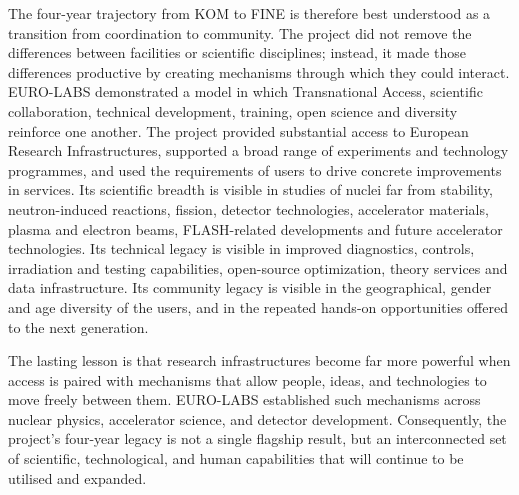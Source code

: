 The four-year trajectory from KOM to FINE is therefore best understood as a transition from coordination to community. The project did not remove the differences between facilities or scientific disciplines; instead, it made those differences productive by creating mechanisms through which they could interact.
EURO-LABS demonstrated a model in which Transnational Access, scientific collaboration, technical development, training, open science and diversity reinforce one another. The project provided substantial access to European Research Infrastructures, supported a broad range of experiments and technology programmes, and used the requirements of users to drive concrete improvements in services.
Its scientific breadth is visible in studies of nuclei far from stability, neutron-induced reactions, fission, detector technologies, accelerator materials, plasma and electron beams, FLASH-related developments and future accelerator technologies. Its technical legacy is visible in improved diagnostics, controls, irradiation and testing capabilities, open-source optimization, theory services and data infrastructure. Its community legacy is visible in the geographical, gender and age diversity of the users, and in the repeated hands-on opportunities offered to the next generation.


The lasting lesson is that research infrastructures become far more powerful when access is paired with mechanisms that allow people, ideas, and technologies to move freely between them. EURO-LABS established such mechanisms across nuclear physics, accelerator science, and detector development. Consequently, the project's four-year legacy is not a single flagship result, but an interconnected set of scientific, technological, and human capabilities that will continue to be utilised and expanded.



